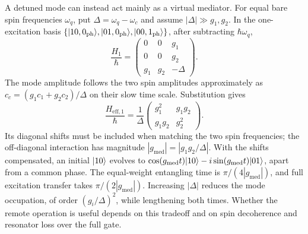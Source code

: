 A detuned mode can instead act mainly as a virtual mediator.
For equal bare spin frequencies \(\omega_q\), put
\(\Delta=\omega_q-\omega_c\) and assume
\(|\Delta|\gg g_1,g_2\). In the one-excitation basis
\(\{\lvert 10,0_{\mathrm{ph}}\rangle,\lvert 01,0_{\mathrm{ph}}\rangle,
\lvert 00,1_{\mathrm{ph}}\rangle\}\), after subtracting
\(\hbar\omega_q\),
\[
 \frac{H_1}{\hbar}=
 \begin{pmatrix}0&0&g_1\\0&0&g_2\\g_1&g_2&-\Delta\end{pmatrix}.
\]
The mode amplitude follows the two spin amplitudes
approximately as \(c_c=(g_1c_1+g_2c_2)/\Delta\) on their slow
time scale. Substitution gives
\begin{equation}
 \frac{H_{\mathrm{eff},1}}{\hbar}
 =\frac1\Delta
  \begin{pmatrix}g_1^2&g_1g_2\\g_1g_2&g_2^2\end{pmatrix}.
 \label{eq:processor-mediated-exchange}
\end{equation}
Its diagonal shifts must be included when matching the two
spin frequencies; the off-diagonal interaction has magnitude
\(|g_{\mathrm{med}}|=|g_1g_2/\Delta|\). With the shifts
compensated, an initial \(\lvert 10\rangle\) evolves to
\(\cos(g_{\mathrm{med}}t)\lvert 10\rangle
-i\sin(g_{\mathrm{med}}t)\lvert 01\rangle\), apart from a common
phase. The equal-weight entangling time is
\(\pi/(4|g_{\mathrm{med}}|)\), and full excitation transfer
takes \(\pi/(2|g_{\mathrm{med}}|)\). Increasing \(|\Delta|\)
reduces the mode occupation, of order \((g_i/\Delta)^2\),
while lengthening both times. Whether the remote operation is
useful depends on this tradeoff and on spin decoherence and
resonator loss over the full gate.
